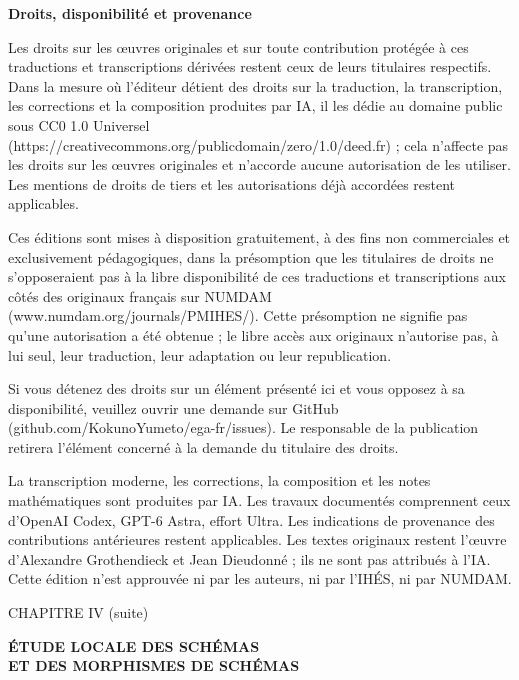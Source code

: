 \documentclass[10pt,oneside]{book}
\newcommand{\oldpage}[2][]{%
  \setcounter{footnote}{0}%
  \marginpar{\scriptsize\textbf{#1}~|~#2}\ignorespaces}
\begin{document}
\clearpage
\begingroup
\small
\noindent\textbf{Droits, disponibilité et provenance}

Les droits sur les œuvres originales et sur toute contribution protégée à ces traductions et transcriptions dérivées restent ceux de leurs titulaires respectifs. Dans la mesure où l'éditeur détient des droits sur la traduction, la transcription, les corrections et la composition produites par IA, il les dédie au domaine public sous CC0 1.0 Universel (https://creativecommons.org/publicdomain/zero/1.0/deed.fr) ; cela n'affecte pas les droits sur les œuvres originales et n'accorde aucune autorisation de les utiliser. Les mentions de droits de tiers et les autorisations déjà accordées restent applicables.

Ces éditions sont mises à disposition gratuitement, à des fins non commerciales et exclusivement pédagogiques, dans la présomption que les titulaires de droits ne s'opposeraient pas à la libre disponibilité de ces traductions et transcriptions aux côtés des originaux français sur NUMDAM (www.numdam.org/journals/PMIHES/). Cette présomption ne signifie pas qu'une autorisation a été obtenue ; le libre accès aux originaux n'autorise pas, à lui seul, leur traduction, leur adaptation ou leur republication.

Si vous détenez des droits sur un élément présenté ici et vous opposez à sa disponibilité, veuillez ouvrir une demande sur GitHub (github.com/KokunoYumeto/ega-fr/issues). Le responsable de la publication retirera l'élément concerné à la demande du titulaire des droits.

La transcription moderne, les corrections, la composition et les notes mathématiques sont produites par IA. Les travaux documentés comprennent ceux d'OpenAI Codex, GPT-6 Astra, effort Ultra. Les indications de provenance des contributions antérieures restent applicables. Les textes originaux restent l'œuvre d'Alexandre Grothendieck et Jean Dieudonné ; ils ne sont pas attribués à l'IA. Cette édition n'est approuvée ni par les auteurs, ni par l'IHÉS, ni par NUMDAM.
\par
\endgroup
\clearpage

%
\clearpage
\thispagestyle{plain}
\oldpage[IV-2]{5}
\label{chapter:IV2-fr}

\begin{center}
{\large CHAPITRE IV (suite)\par}
\vspace{1.5em}
{\Large\bfseries ÉTUDE LOCALE DES SCHÉMAS\\
ET DES MORPHISMES DE SCHÉMAS\par}
\end{center}
\end{document}
